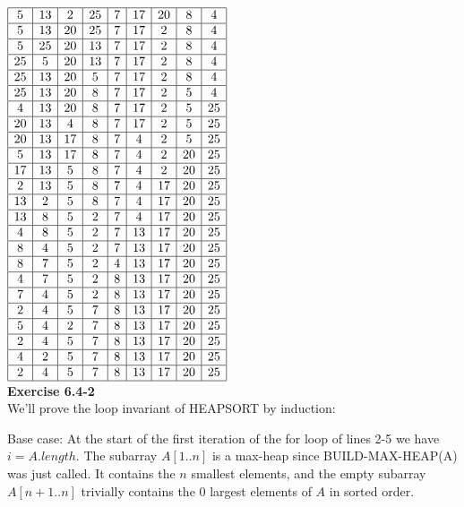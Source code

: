 \documentclass{article}
\begin{document}
$
\begin{array}{|c|c|c|c|c|c|c|c|c|}
\hline
5&13&2&25&7&17&20&8&4\\
\hline
5&13&20&25&7&17&2&8&4\\
\hline
5&25&20&13&7&17&2&8&4\\
\hline
25&5&20&13&7&17&2&8&4\\
\hline
25&13&20&5&7&17&2&8&4\\
\hline
25&13&20&8&7&17&2&5&4\\
\hline
4&13&20&8&7&17&2&5&25\\
\hline
20&13&4&8&7&17&2&5&25\\
\hline
20&13&17&8&7&4&2&5&25\\
\hline
5&13&17&8&7&4&2&20&25\\
\hline
17&13&5&8&7&4&2&20&25\\
\hline
2&13&5&8&7&4&17&20&25\\
\hline
13&2&5&8&7&4&17&20&25\\
\hline
13&8&5&2&7&4&17&20&25\\
\hline
4&8&5&2&7&13&17&20&25\\
\hline
8&4&5&2&7&13&17&20&25\\
\hline
8&7&5&2&4&13&17&20&25\\
\hline
4&7&5&2&8&13&17&20&25\\
\hline
7&4&5&2&8&13&17&20&25\\
\hline
2&4&5&7&8&13&17&20&25\\
\hline
5&4&2&7&8&13&17&20&25\\
\hline
2&4&5&7&8&13&17&20&25\\
\hline
4&2&5&7&8&13&17&20&25\\
\hline
2&4&5&7&8&13&17&20&25\\
\hline
\end{array}
$\\

\noindent\textbf{Exercise 6.4-2}\\

We'll prove the loop invariant of HEAPSORT by induction:

Base case: At the start of the first iteration of the for loop of lines 2-5 we have $i=A.length$. The subarray $A[1..n]$ is a max-heap since BUILD-MAX-HEAP(A) was just called.  It contains the $n$ smallest elements, and the empty subarray $A[n+1..n]$ trivially contains the 0 largest elements of $A$ in sorted order.\\
\end{document}
